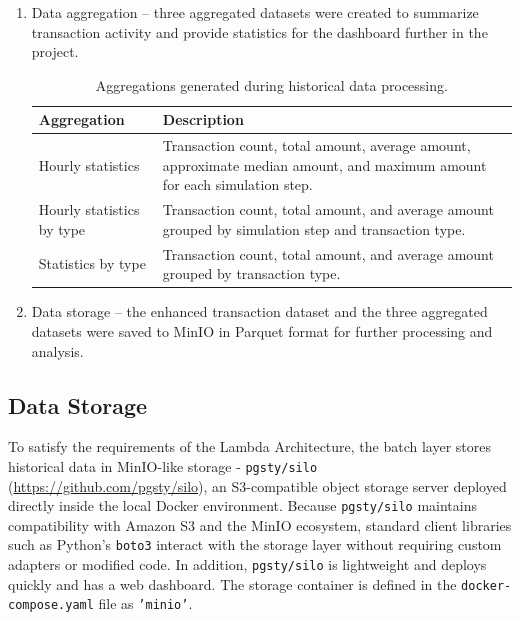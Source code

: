 \documentclass[titlepage]{article}
\begin{document}
\begin{enumerate}
    \item Data aggregation -- three aggregated datasets were created to summarize transaction activity and provide statistics for the dashboard further in the project.
    \begin{table}[H]
        \centering
        \caption{Aggregations generated during historical data processing.}\label{tab:historical_aggregations}
        \small
        \begin{tabular}{lp{9cm}}
            \toprule
            \textbf{Aggregation} & \textbf{Description}\\
            \midrule
            Hourly statistics & Transaction count, total amount, average amount, approximate median amount, and maximum amount for each simulation step.\\
            Hourly statistics by type & Transaction count, total amount, and average amount grouped by simulation step and transaction type.\\
            Statistics by type & Transaction count, total amount, and average amount grouped by transaction type.\\
            \bottomrule
        \end{tabular}
    \end{table}

    \item Data storage -- the enhanced transaction dataset and the three aggregated datasets were saved to MinIO in Parquet format for further processing and analysis.

\end{enumerate}

\subsection{Data Storage}

To satisfy the requirements of the Lambda Architecture, the batch layer stores historical data in MinIO-like storage - \texttt{pgsty/silo} (\url{https://github.com/pgsty/silo}), an S3-compatible object storage server deployed directly inside the local Docker environment.
Because \texttt{pgsty/silo} maintains compatibility with Amazon S3 and the MinIO ecosystem, standard client libraries such as Python's \texttt{boto3} interact with the storage layer without requiring custom adapters or modified code.
In addition, \texttt{pgsty/silo} is lightweight and deploys quickly and has a web dashboard.
The storage container is defined in the \texttt{docker-compose.yaml} file as \texttt{'minio'}. 
\end{document}
